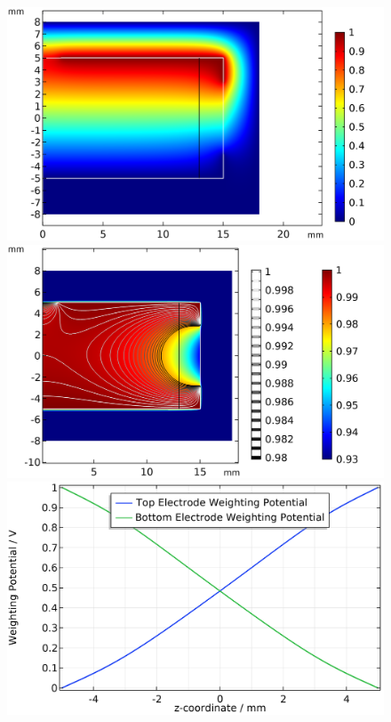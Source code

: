 \begin{figure}
\begin{minipage}{0.48\textwidth}
\centering
\includegraphics[scale=0.5]{Figures/Electrodes/pl38_swp.png}
\includegraphics[scale=0.5]{Figures/Electrodes/pl38_twp.png}
\includegraphics[scale=0.5]{Figures/Electrodes/pl38_wp_plot.png}

\end{minipage}
\end{figure}
